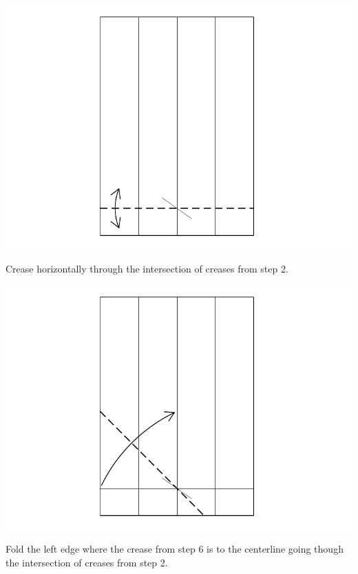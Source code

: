\documentclass[11pt]{article}
\begin{document}
\begin{minipage}[t]{0.3\textwidth}
  \includegraphics[width=\textwidth]{../figs/fig04-04}
  \begin{itemize}{\item[4.] Crease horizontally through the intersection of creases from step 2.}\end{itemize}
\end{minipage}
\begin{minipage}[t]{0.3\textwidth}
  \includegraphics[width=\textwidth]{../figs/fig04-05}
  \begin{itemize}{\item[5.] Fold the left edge where the crease from step 6 is to the centerline going though the intersection of creases from step 2.}\end{itemize}
\end{minipage}
\end{document}
